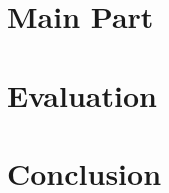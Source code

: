 \documentclass[paper=a4,draft=false]{scrartcl}
\begin{document}
\section{Main Part}\label{sec:main_part}


\section{Evaluation}\label{sec:evaluation}


\section{Conclusion}\label{sec:conclusion}


\appendix




\end{document}

